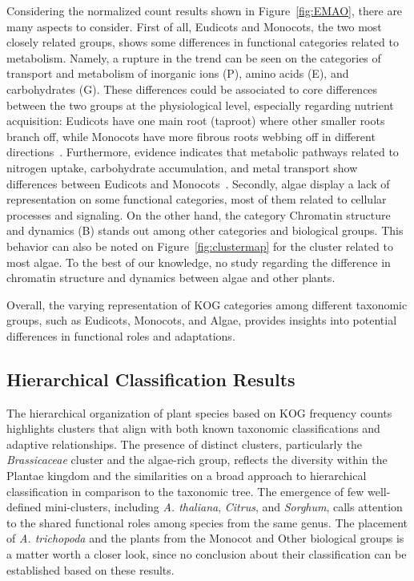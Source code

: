 Considering the normalized count results shown in 
Figure~\ref{fig:EMAO}, there are many aspects to consider.
First of all, Eudicots and Monocots, the two most closely 
related groups, shows some differences in functional 
categories related to metabolism. Namely, a rupture 
in the trend can be seen on 
the categories of transport and metabolism of inorganic ions 
(P), amino acids (E), and carbohydrates (G). These 
differences could be associated to core differences between 
the two groups at the physiological level, especially 
regarding nutrient acquisition: Eudicots have one main root 
(taproot) where other smaller roots branch off, while 
Monocots have more fibrous roots webbing off in different 
directions~\citep{freschet2021}. Furthermore, evidence 
indicates that metabolic pathways related to nitrogen 
uptake, carbohydrate accumulation, and metal 
transport show differences between Eudicots and 
Monocots~\citep{yang2020,tian2016}.
Secondly, algae display a lack of representation on some 
functional categories, most of them related to cellular 
processes and signaling. On the other hand, the category 
Chromatin structure and dynamics (B) stands out among other 
categories and biological groups. This behavior can also 
be noted on Figure~\ref{fig:clustermap} for the cluster
related to most algae. To the best of our 
knowledge, no study regarding the difference in chromatin 
structure and dynamics between algae and other plants.

Overall, the varying 
representation of KOG categories among different taxonomic 
groups, such as Eudicots, Monocots, and Algae, provides 
insights into potential differences in functional roles 
and adaptations.


\subsection{Hierarchical Classification Results}
\label{sec:conclusion.hierarchy}

The hierarchical organization of plant species based on 
KOG frequency counts highlights clusters that align with 
both known taxonomic classifications and adaptive 
relationships. The presence of distinct clusters, 
particularly the \emph{Brassicaceae} cluster and the 
algae-rich group, reflects the diversity within the 
Plantae kingdom and the similarities on a broad approach to
hierarchical classification in comparison to the taxonomic tree. 
The emergence of few well-defined mini-clusters, including 
\emph{A. thaliana}, \emph{Citrus}, and \emph{Sorghum}, 
calls attention to the shared functional roles among 
species from the same genus. The placement of 
\emph{A. trichopoda} and the plants from the Monocot and 
Other biological groups is a matter worth a closer look, 
since no conclusion about their classification can be 
established based on these results.


